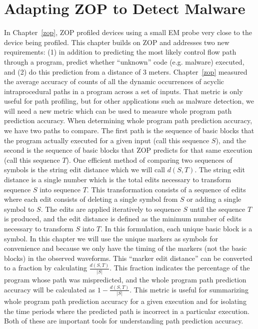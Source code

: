 \section{Adapting ZOP to Detect Malware}
\label{adapt_zop}

In Chapter~\ref{zop}, ZOP profiled devices using a small EM probe very close to the device being profiled. This chapter builds on ZOP and addresses two new requirements: (1) in addition to predicting the most likely control flow path through a program, predict whether ``unknown'' code (e.g. malware) executed, and (2) do this prediction from a distance of 3 meters. Chapter~\ref{zop} measured the average accuracy of counts of all the dynamic occurrences of acyclic intraprocedural paths in a program across a set of inputs. That metric is only useful for path profiling, but for other applications such as malware detection, we will need a new metric which can be used to measure whole program path prediction accuracy. When determining whole program path prediction accuracy, we have two paths to compare. The first path is the sequence of basic blocks that the program actually executed for a given input (call this sequence $S$), and the second is the sequence of basic blocks that ZOP predicts for that same execution (call this sequence $T$). One efficient method of comparing two sequences of symbols is the string edit distance which we will call $d(S,T)$. The string edit distance is a single number which is the total edits necessary to transform sequence $S$ into sequence $T$. This transformation consists of a sequence of edits where each edit consists of deleting a single symbol from $S$ or adding a single symbol to $S$. The edits are applied iteratively to sequence $S$ until the sequence $T$ is produced, and the edit distance is defined as the minimum number of edits necessary to transform $S$ into $T$. In this formulation, each unique basic block is a symbol. In this chapter we will use the unique markers as symbols for convenience and because we only have the timing of the markers (not the basic blocks) in the observed waveforms. This ``marker edit distance'' can be converted to a fraction by calculating $\frac{d(S,T)}{|S|}$. This fraction indicates the percentage of the program whose path was mispredicted, and the whole program path prediction accuracy will be calculated as $1 - \frac{d(S,T)}{|S|}$. This metric is useful for summarizing whole program path prediction accuracy for a given execution and for isolating the time periods where the predicted path is incorrect in a particular execution. Both of these are important tools for understanding path prediction accuracy.

